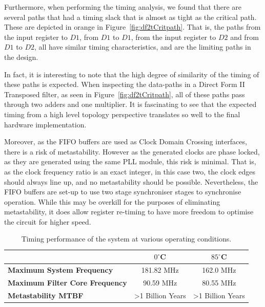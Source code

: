 \documentclass[]{article}
\begin{document}
Furthermore, when performing the timing analysis, we found that there are several paths that had a timing slack that is almost as tight as the critical path. These are depicted in orange in Figure~\ref{fig:df2tCritpath}.
That is, the paths from the input register to $D1$, from $D1$ to $D1$, from the input register to $D2$ and from $D1$ to $D2$, all have similar timing characteristics, and are the limiting paths in the design.

In fact, it is interesting to note that the high degree of similarity of the timing of these paths is expected. When inspecting the data-paths in a Direct Form II Transposed filter, as seen in Figure~\ref{fig:df2tCritpath}, all of these paths pass through two adders and one multiplier.
It is fascinating to see that the expected timing from a high level topology perspective translates so well to the final hardware implementation.

Moreover, as the FIFO buffers are used as Clock Domain Crossing interfaces, there is a risk of metastability. However as the generated clocks are phase locked, as they are generated using the same PLL module, this risk is minimal.
That is, as the clock frequency ratio is an exact integer, in this case two, the clock edges should always line up, and no metastability should be possible.
Nevertheless, the FIFO buffers are set-up to use two stage synchroniser stages to synchronise operation. While this may be overkill for the purposes of eliminating metastability, it does allow register re-timing to have more freedom to optimise the circuit for higher speed.

\begin{table}[tbp]
	\caption{Timing performance of the system at various operating conditions.}
	\label{tab:fmax}
	\begin{center}
		\begin{tabular}{l|cc}
		\hline

		\hline
			 										& $0^\circ$C 					& $85^\circ$C 	\\
		\hline
			\textbf{Maximum System Frequency} 		& 181.82 MHz					& 162.0 MHz 	\\
		\hline
			\textbf{Maximum Filter Core Frequency}	& 90.59 MHz						& 80.55 MHz 	\\
		\hline
			\textbf{Metastability MTBF}				& \textgreater 1 Billion Years	& \textgreater 1 Billion Years \\
		\hline

		\hline
		\end{tabular}
	\end{center}
\end{table}
\end{document}
